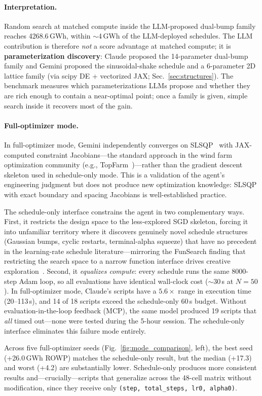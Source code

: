\paragraph{Interpretation.}
Random search at matched compute inside the LLM-proposed dual-bump
family reaches 4268.6\,GWh, within $\sim$4\,GWh of the LLM-deployed
schedules. The LLM contribution is therefore \emph{not} a score
advantage at matched compute; it is \textbf{parameterization
discovery}: Claude proposed the 14-parameter dual-bump family and
Gemini proposed the sinusoidal-shake schedule and a 6-parameter 2D
lattice family (via scipy DE + vectorized JAX;
Sec.~\ref{sec:structures}). The benchmark measures which
parameterizations LLMs propose and whether they are rich enough to
contain a near-optimal point; once a family is given, simple search
inside it recovers most of the gain.


\paragraph{Full-optimizer mode.}
In full-optimizer mode, Gemini independently converges on
SLSQP~\cite{kraft1988software} with JAX-computed constraint
Jacobians---the standard approach in the wind farm optimization
community (e.g.,
TopFarm~\cite{pedersen2019topfarm})---rather than the gradient
descent skeleton used in schedule-only mode. This is a validation
of the agent's engineering judgment but does not produce new
optimization knowledge: SLSQP with exact boundary and spacing
Jacobians is well-established practice.

The schedule-only interface constrains the agent in two
complementary ways. First, it restricts the design space to the
less-explored SGD skeleton, forcing it into unfamiliar territory
where it discovers genuinely novel schedule structures (Gaussian
bumps, cyclic restarts, terminal-alpha squeeze) that have no
precedent in the learning-rate schedule literature---mirroring the
FunSearch finding that restricting the search space to a narrow
function interface drives creative
exploration~\cite{fawzi2024funsearch}. Second, it \emph{equalizes
compute}: every schedule runs the same 8000-step Adam loop, so all
evaluations have identical wall-clock cost ($\sim$30\,s at
$N\!=\!50$). In full-optimizer mode, Claude's scripts have a
$5.6\!\times$ range in execution time (20--113\,s), and 14 of 18
scripts exceed the schedule-only 60\,s budget. Without
evaluation-in-the-loop feedback (MCP), the same model produced 19
scripts that \emph{all} timed out---none were tested during the
5-hour session. The schedule-only interface eliminates this failure
mode entirely.

Across five full-optimizer seeds
(Fig.~\ref{fig:mode_comparison}, left), the best seed
(+26.0\,GWh ROWP) matches the schedule-only result, but the median
(+17.3) and worst (+4.2) are substantially lower. Schedule-only
produces more consistent results and---crucially---scripts that
generalize across the 48-cell matrix without modification, since
they receive only \texttt{(step, total\_steps, lr0, alpha0)}.
